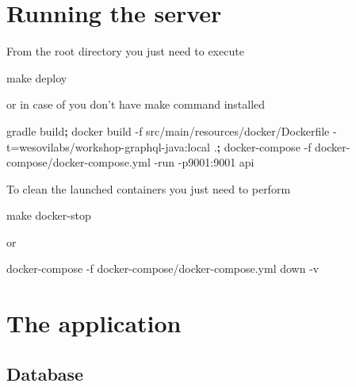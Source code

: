 \documentclass[]{book}
\newenvironment{Shaded}{\begin{snugshade}}{\end{snugshade}}
\newcommand{\KeywordTok}[1]{\textcolor[rgb]{0.13,0.29,0.53}{\textbf{#1}}}
\newcommand{\FunctionTok}[1]{\textcolor[rgb]{0.00,0.00,0.00}{#1}}
\newcommand{\ExtensionTok}[1]{#1}
\newcommand{\NormalTok}[1]{#1}
\begin{document}
\section{Running the server}\label{running-the-server}

From the root directory you just need to execute

\begin{Shaded}
\begin{Highlighting}[]
\FunctionTok{make}\NormalTok{ deploy}
\end{Highlighting}
\end{Shaded}

or in case of you don't have make command installed

\begin{Shaded}
\begin{Highlighting}[]
\ExtensionTok{gradle}\NormalTok{ build}\KeywordTok{;}
\ExtensionTok{docker}\NormalTok{ build -f src/main/resources/docker/Dockerfile -t=wesovilabs/workshop-graphql-java:local .}\KeywordTok{;}
\ExtensionTok{docker-compose}\NormalTok{ -f docker-compose/docker-compose.yml -run -p9001:9001 api}
\end{Highlighting}
\end{Shaded}

To clean the launched containers you just need to perform

\begin{Shaded}
\begin{Highlighting}[]
\FunctionTok{make}\NormalTok{ docker-stop}
\end{Highlighting}
\end{Shaded}

or

\begin{Shaded}
\begin{Highlighting}[]
\ExtensionTok{docker-compose}\NormalTok{ -f docker-compose/docker-compose.yml down -v}
\end{Highlighting}
\end{Shaded}

\section{The application}\label{the-application}

\subsection{Database}\label{database}
\end{document}
